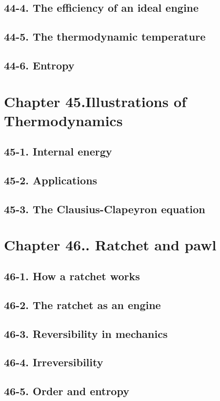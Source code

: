 \documentclass{article}
\begin{document}
\subsection{44-4. The efficiency of an ideal engine}
\subsection{44-5. The thermodynamic temperature}
\subsection{44-6. Entropy}
\section{Chapter 45.Illustrations of Thermodynamics}
\subsection{45-1. Internal energy}
\subsection{45-2. Applications}
\subsection{45-3. The Clausius-Clapeyron equation}
\section{Chapter 46.. Ratchet and pawl}
\subsection{46-1. How a ratchet works}
\subsection{46-2. The ratchet as an engine}
\subsection{46-3. Reversibility in mechanics}
\subsection{46-4. Irreversibility}
\subsection{46-5. Order and entropy}
\end{document}
